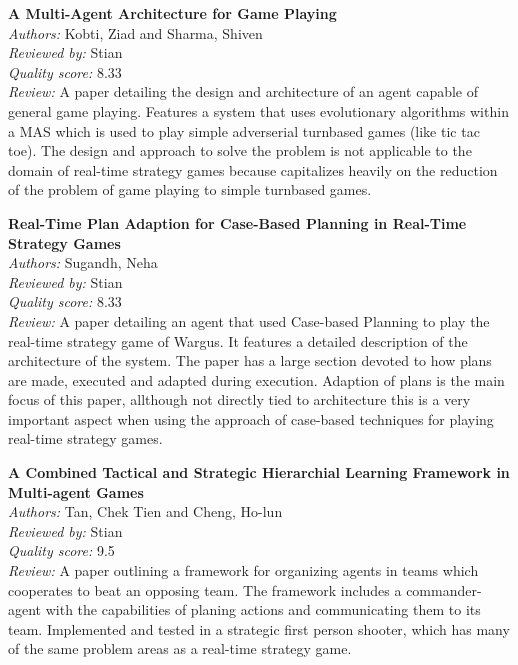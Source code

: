 {\textbf{A Multi-Agent Architecture for Game Playing\cite{kobti2007multi}}\\
\textit{Authors:} Kobti, Ziad and Sharma, Shiven\\
\textit{Reviewed by:} Stian\\
\textit{Quality score:} 8.33\\
\textit{Review:} A paper detailing the design and architecture of an agent capable of general game playing. Features a system that uses evolutionary algorithms within a MAS which is used to play simple adverserial turnbased games (like tic tac toe). The design and approach to solve the problem is not applicable to the domain of real-time strategy games because capitalizes heavily on the reduction of the problem of game playing to simple turnbased games.

\textbf{Real-Time Plan Adaption for Case-Based Planning in Real-Time Strategy Games\cite{sugandh2008real}}\\
\textit{Authors:} Sugandh, Neha\\
\textit{Reviewed by:} Stian\\
\textit{Quality score:} 8.33\\
\textit{Review:} A paper detailing an agent that used Case-based Planning to play the real-time strategy game of Wargus. It features a detailed description of the architecture of the system. The paper has a large section devoted to how plans are made, executed and adapted during execution. Adaption of plans is the main focus of this paper, allthough not directly tied to architecture this is a very important aspect when using the approach of case-based techniques for playing real-time strategy games.

\textbf{A Combined Tactical and Strategic Hierarchial Learning Framework in Multi-agent Games\cite{tan2008combined}}\\
\textit{Authors:} Tan, Chek Tien and Cheng, Ho-lun\\
\textit{Reviewed by:} Stian\\
\textit{Quality score:} 9.5\\
\textit{Review:} A paper outlining a framework for organizing agents in teams which cooperates to beat an opposing team. The framework includes a commander-agent with the capabilities of planing actions and communicating them to its team. Implemented and tested in a strategic first person shooter, which has many of the same problem areas as a real-time strategy game.
 
}

